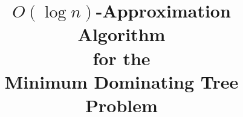 \title{
$O(\log n)$-Approximation Algorithm 
\\
for the 
\\
Minimum Dominating Tree Problem
}

\date{}